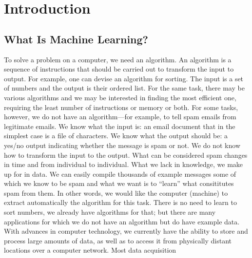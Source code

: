 \chapter{Introduction}
\label{chap:01-introduction}

\section{What Is Machine Learning?}

To solve a problem on a computer, we need an algorithm. An algorithm is a sequence of instructions that should be carried out to transform the input to output. For example, one can devise an algorithm for sorting. The input is a set of numbers and the output is their ordered list. For the same task, there may be various algorithms and we may be interested in finding the most efficient one, requiring the least number of instructions or memory or both. For some tasks, however, we do not have an algorithm---for example, to tell spam emails from legitimate emails. We know what the input is: an email document that in the simplest case is a file of characters. We know what the output should be: a yes/no output indicating whether the message is spam or not. We do not know how to transform the input to the output. What can be considered spam changes in time and from individual to individual. What we lack in knowledge, we make up for in data. We can easily compile thousands of example messages some of which we know to be spam and what we want is to “learn” what consititutes spam from them. In other words, we would like the computer (machine) to extract automatically the algorithm for this task. There is no need to learn to sort numbers, we already have algorithms for that; but there are many applications for which we do not have an algorithm but do have example data. With advances in computer technology, we currently have the ability to store and process large amounts of data, as well as to access it from physically distant locations over a computer network. Most data acquisition

